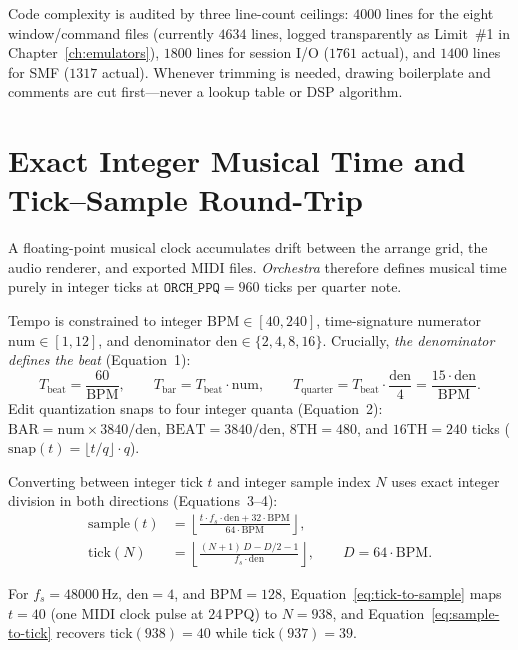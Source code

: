 Code complexity is audited by three line-count ceilings: $4000$ lines for the eight window/command files (currently $4634$ lines, logged transparently as Limit~\#1 in Chapter~\ref{ch:emulators}), $1800$ lines for session I/O ($1761$ actual), and $1400$ lines for SMF ($1317$ actual). Whenever trimming is needed, drawing boilerplate and comments are cut first—never a lookup table or DSP algorithm.

\section{Exact Integer Musical Time and Tick--Sample Round-Trip}

A floating-point musical clock accumulates drift between the arrange grid, the audio renderer, and exported MIDI files. \emph{Orchestra} therefore defines musical time purely in integer ticks at $\texttt{ORCH\_PPQ} = 960$ ticks per quarter note.

Tempo is constrained to integer $\mathrm{BPM} \in [40, 240]$, time-signature numerator $\mathrm{num} \in [1, 12]$, and denominator $\mathrm{den} \in \{2, 4, 8, 16\}$. Crucially, \emph{the denominator defines the beat} (Equation~1):
\begin{equation}
\label{eq:beat-bar}
T_{\mathrm{beat}} = \frac{60}{\mathrm{BPM}}, \qquad
T_{\mathrm{bar}} = T_{\mathrm{beat}} \cdot \mathrm{num}, \qquad
T_{\mathrm{quarter}} = T_{\mathrm{beat}} \cdot \frac{\mathrm{den}}{4} = \frac{15 \cdot \mathrm{den}}{\mathrm{BPM}}.
\end{equation}
Edit quantization snaps to four integer quanta (Equation~2):
$\mathrm{BAR} = \mathrm{num} \times 3840 / \mathrm{den}$, $\mathrm{BEAT} = 3840 / \mathrm{den}$, $\mathrm{8TH} = 480$, and $\mathrm{16TH} = 240$ ticks ($\mathrm{snap}(t) = \lfloor t / q \rfloor \cdot q$).

Converting between integer tick $t$ and integer sample index $N$ uses exact integer division in both directions (Equations~3--4):
\begin{align}
\label{eq:tick-to-sample}
\mathrm{sample}(t) &= \left\lfloor \frac{t \cdot f_s \cdot \mathrm{den} + 32\cdot\mathrm{BPM}}{64\cdot\mathrm{BPM}} \right\rfloor, \\
\label{eq:sample-to-tick}
\mathrm{tick}(N) &= \left\lfloor \frac{(N + 1)\,D - D/2 - 1}{f_s \cdot \mathrm{den}} \right\rfloor, \qquad D = 64\cdot\mathrm{BPM}.
\end{align}

\begin{proposition}
For $f_s = 48000\,\text{Hz}$, $\mathrm{den} = 4$, and $\mathrm{BPM} = 128$, Equation~\eqref{eq:tick-to-sample} maps $t = 40$ (one MIDI clock pulse at $24\,\text{PPQ}$) to $N = 938$, and Equation~\eqref{eq:sample-to-tick} recovers $\mathrm{tick}(938) = 40$ while $\mathrm{tick}(937) = 39$.
\end{proposition}

